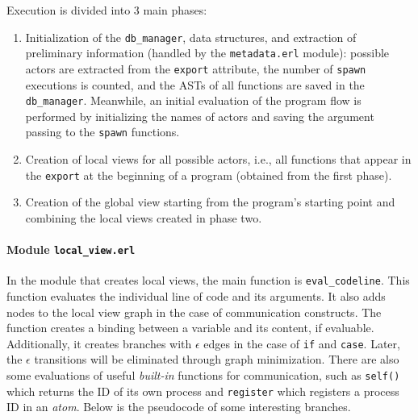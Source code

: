 Execution is divided into 3 main phases:
\begin{enumerate}
    \item Initialization of the \texttt{db\_manager}, data structures, and extraction of preliminary information (handled by the \texttt{metadata.erl} module): possible actors are extracted from the \texttt{export} attribute, the number of \texttt{spawn} executions is counted, and the ASTs of all functions are saved in the \texttt{db\_manager}. Meanwhile, an initial evaluation of the program flow is performed by initializing the names of actors and saving the argument passing to the \texttt{spawn} functions.
    \item Creation of local views for all possible actors, i.e., all functions that appear in the \texttt{export} at the beginning of a program (obtained from the first phase).
    \item Creation of the global view starting from the program's starting point and combining the local views created in phase two.
\end{enumerate}


\paragraph{Module \texttt{local\_view.erl}}
In the module that creates local views, the main function is \texttt{eval\_codeline}. This function evaluates the individual line of code and its arguments. It also adds nodes to the local view graph in the case of communication constructs. The function creates a binding between a variable and its content, if evaluable. Additionally, it creates branches with $\epsilon$ edges in the case of \texttt{if} and \texttt{case}. Later, the $\epsilon$ transitions will be eliminated through graph minimization. There are also some evaluations of useful \textit{built-in} functions for communication, such as \texttt{self()} which returns the ID of its own process and \texttt{register} which registers a process ID in an \textit{atom}.
Below is the pseudocode of some interesting branches.

